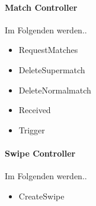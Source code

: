 \paragraph{Match Controller}
Im Folgenden werden..
\begin{itemize}
	\item RequestMatches
	\item DeleteSupermatch
	\item DeleteNormalmatch
	\item Received
	\item Trigger
\end{itemize} 



\paragraph{Swipe Controller}
Im Folgenden werden..
\begin{itemize}
	\item CreateSwipe
\end{itemize} 